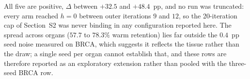 \documentclass[11pt]{article}
\begin{document}
\noindent All five are positive, $\Delta$ between $+32.5$ and $+48.4$~pp, and no run was
truncated: every arm reached $h=0$ between outer iterations $9$ and $12$, so the
20-iteration cap of Section~S2 was never binding in any configuration reported here.
The spread across organs ($57.7$ to $78.3\%$ warm retention) lies far outside the
$0.4$~pp seed noise measured on BRCA, which suggests it reflects the tissue rather than
the draw; a single seed per organ cannot establish that, and these rows are therefore
reported as an exploratory extension rather than pooled with the three-seed BRCA row.



\end{document}
